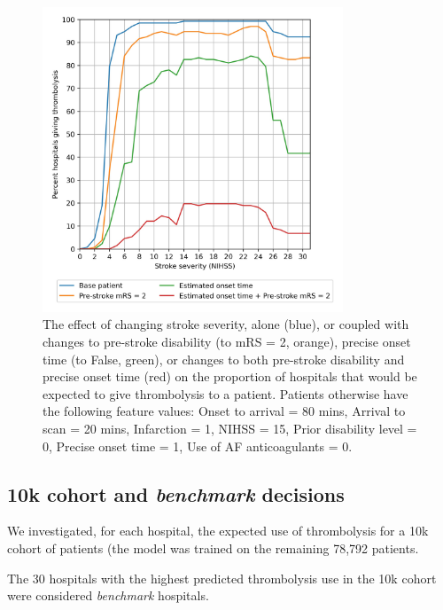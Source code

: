 \begin{figure}
\centering
\includegraphics[width=0.8\textwidth]{./images/20_synthetic_xgb_10_features_interactions}
\caption{The effect of changing stroke severity, alone (blue), or coupled with changes to pre-stroke disability (to mRS = 2, orange), precise onset time (to False, green), or changes to both pre-stroke disability and precise onset time (red) on the proportion of hospitals that would be expected to give thrombolysis to a patient. Patients otherwise have the following feature values: Onset to arrival = 80 mins, Arrival to scan = 20 mins, Infarction = 1, NIHSS = 15, Prior disability level = 0, Precise onset time = 1, Use of AF anticoagulants = 0.}
\label{fig:artificial_2}
\end{figure}




\subsection{10k cohort and \emph{benchmark} decisions}

We investigated, for each hospital, the expected use of thrombolysis for a 10k cohort of patients (the model was trained on the remaining 78,792 patients.

The 30 hospitals with the highest predicted thrombolysis use in the 10k cohort were considered \emph{benchmark} hospitals.

